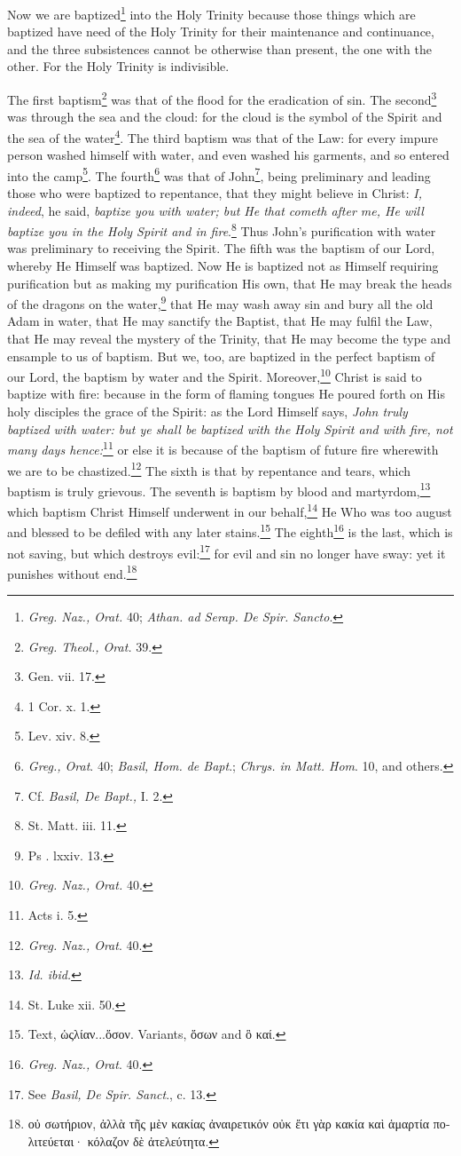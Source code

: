 Now we are baptized\footnote{\emph{Greg. Naz., Orat. }40; \emph{Athan. ad Serap. De Spir. Sancto}.} into the Holy Trinity because those things which are baptized have need of the Holy Trinity for their maintenance and continuance, and the three subsistences cannot be otherwise than present, the one with the other. For the Holy Trinity is indivisible.

The first baptism\footnote{\emph{Greg. Theol., Orat. }39.} was that of the flood for the eradication of sin. The second\footnote{Gen. vii. 17.} was through the sea and the cloud: for the cloud is the symbol of the Spirit and the sea of the water\footnote{1 Cor. x. 1.}. The third baptism was that of the Law: for every impure person washed himself with water, and even washed his garments, and so entered into the camp\footnote{Lev. xiv. 8.}. The fourth\footnote{\emph{Greg., Orat}. 40; \emph{Basil, Hom. de Bapt}.; \emph{Chrys. in Matt. Hom}. 10, and others.} was that of John\footnote{Cf. \emph{Basil, De Bapt., }I. 2.}, being preliminary and leading those who were baptized to repentance, that they might believe in Christ: \emph{I, }\emph{indeed}, he said, \emph{baptize you with water; but He that cometh after me, He will baptize you in the Holy Spirit and in fire}.\footnote{St. Matt. iii. 11.} Thus John’s purification with water was preliminary to receiving the Spirit. The fifth was the baptism of our Lord, whereby He Himself was baptized. Now He is baptized not as Himself requiring purification but as making my purification His own, that He may break the heads of the dragons on the water,\footnote{Ps . lxxiv. 13.} that He may wash away sin and bury all the old Adam in water, that He may sanctify the Baptist, that He may fulfil the Law, that He may reveal the mystery of the Trinity, that He may become the type and ensample to us of baptism. But we, too, are baptized in the perfect baptism of our Lord, the baptism by water and the Spirit. Moreover,\footnote{\emph{Greg. Naz., Orat. }40.} Christ is said to baptize with fire: because in the form of flaming tongues He poured forth on His holy disciples the grace of the Spirit: as the Lord Himself says, \emph{John truly baptized with water: but ye shall be baptized with the Holy Spirit and with fire, not many days hence:}\footnote{Acts i. 5.} or else it is because of the baptism of future fire wherewith we are to be chastized.\footnote{\emph{Greg. Naz., Orat}. 40.} The sixth is that by repentance and tears, which baptism is truly grievous. The seventh is baptism by blood and martyrdom,\footnote{\emph{Id. ibid.}} which baptism Christ Himself underwent in our behalf,\footnote{St. Luke xii. 50.} He Who was too august and blessed to be defiled with any later stains.\footnote{Text, \textgreek{ὡςλίαν...ὅσον}. Variants, \textgreek{ὅσων} and \textgreek{ὃ καί}.} The eighth\footnote{\emph{Greg. Naz., Orat}. 40.} is the last, which is not saving, but which destroys evil:\footnote{See \emph{Basil, De Spir. Sanct}., c. 13.} for evil and sin no longer have sway: yet it punishes without end.\footnote{\textgreek{οὐ σωτήριον, ἀλλὰ τῆς μὲν κακίας ἀναιρετικόν οὐκ ἔτι γὰρ κακία καὶ ἁμαρτία πολιτεύεται· κόλαζον δὲ ἀτελεύτητα}.}

